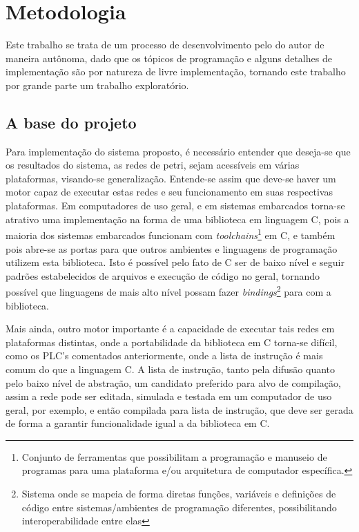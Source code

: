 \section{Metodologia}

Este trabalho se trata de um processo de desenvolvimento pelo do autor de maneira autônoma, dado que os tópicos de programação e alguns detalhes de implementação são por natureza de livre implementação, tornando este trabalho por grande parte um trabalho exploratório. 

\subsection{A base do projeto}

Para implementação do sistema proposto, é necessário entender que deseja-se que os resultados do sistema, as redes de petri, sejam acessíveis em várias plataformas, visando-se generalização. Entende-se assim que deve-se haver um motor capaz de executar estas redes e seu funcionamento em suas respectivas plataformas. Em computadores de uso geral, e em sistemas embarcados torna-se atrativo uma implementação na forma de uma biblioteca em linguagem C, pois a maioria dos sistemas embarcados funcionam com \textit{toolchains}\footnote{Conjunto de ferramentas que possibilitam a programação e manuseio de programas para uma plataforma e/ou arquitetura de computador específica.} em C, e também pois abre-se as portas para que outros ambientes e linguagens de programação utilizem esta biblioteca. Isto é possível pelo fato de C ser de baixo nível e seguir padrões estabelecidos de arquivos e execução de código no geral, tornando possível que linguagens de mais alto nível possam fazer \textit{bindings}\footnote{Sistema onde se mapeia de forma diretas funções, variáveis e definições de código entre sistemas/ambientes de programação diferentes, possibilitando interoperabilidade entre elas} para com a biblioteca. 

Mais ainda, outro motor importante é a capacidade de executar tais redes em plataformas distintas, onde a portabilidade da biblioteca em C torna-se difícil, como os PLC's comentados anteriormente, onde a lista de instrução é mais comum do que a linguagem C. A lista de instrução, tanto pela difusão quanto pelo baixo nível de abstração, um candidato preferido para alvo de compilação, assim a rede pode ser editada, simulada e testada em um computador de uso geral, por exemplo, e então compilada para lista de instrução, que deve ser gerada de forma a garantir funcionalidade igual a da biblioteca em C.

